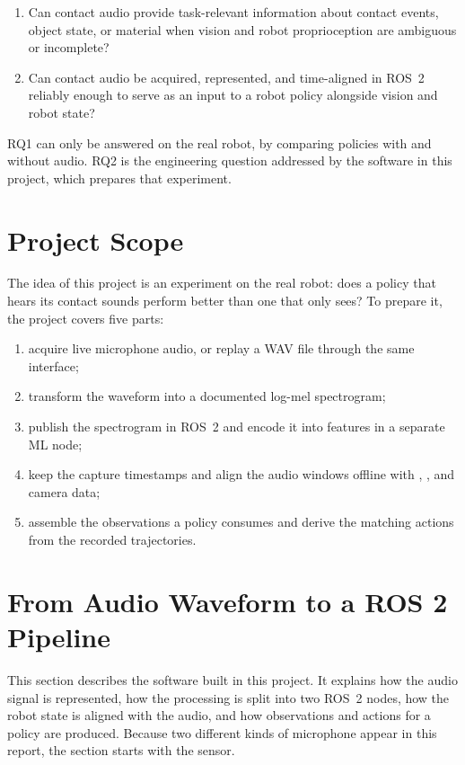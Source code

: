 \documentclass[
  english,
  accentcolor=11b,
  type=intern,
  marginpar=false,
  logofile=figures/PEARLTUDA.png
]{tudapub}
\DeclareRobustCommand{\topic}[1]{\texttt{\detokenize{#1}}}
\begin{document}
\begin{enumerate}[leftmargin=*,label=\textbf{RQ\arabic*:},itemsep=7pt]
  \item Can contact audio provide task-relevant information about contact events, object state, or material when vision and robot proprioception are ambiguous or incomplete?
  \item Can contact audio be acquired, represented, and time-aligned in ROS~2 reliably enough to serve as an input to a robot policy alongside vision and robot state?
\end{enumerate}

RQ1 can only be answered on the real robot, by comparing policies with and without audio. RQ2 is the engineering question addressed by the software in this project, which prepares that experiment.

\section{Project Scope}

The idea of this project is an experiment on the real robot: does a policy that hears its contact sounds perform better than one that only sees? To prepare it, the project covers five parts:

\begin{enumerate}[leftmargin=*]
  \item acquire live microphone audio, or replay a WAV file through the same interface;
  \item transform the waveform into a documented log-mel spectrogram;
  \item publish the spectrogram in ROS~2 and encode it into features in a separate ML node;
  \item keep the capture timestamps and align the audio windows offline with \topic{/joint_states}, \topic{/tf}, and camera data;
  \item assemble the observations a policy consumes and derive the matching actions from the recorded trajectories.
\end{enumerate}

\section{From Audio Waveform to a ROS 2 Pipeline}
\label{sec:pipeline}

This section describes the software built in this project. It explains how the audio signal is represented, how the processing is split into two ROS~2 \citep{macenski2022ros2} nodes, how the robot state is aligned with the audio, and how observations and actions for a policy are produced. Because two different kinds of microphone appear in this report, the section starts with the sensor.
\end{document}
